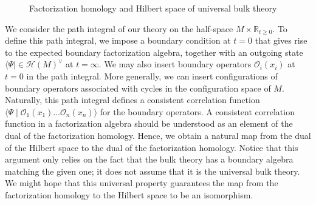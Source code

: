\documentclass[11pt]{article}
\numberwithin{equation}{section}
\begin{document}
\begin{figure}[h!]
\begin{center}
\end{center}\caption{Factorization homology and Hilbert space of universal bulk theory}
	\end{figure}


We consider the path integral of our theory on the half-space $M \times \mathbb{R}_{t \geq 0}$. To define this path integral, we impose a boundary condition at $t = 0$ that gives rise to the expected boundary factorization algebra, together with an outgoing state $\langle \Psi\rvert \in \mathcal{H}(M)^\vee$ at $t = \infty$. We may also insert boundary operators $\mathcal{O}_i(x_i)$ at $t = 0$ in the path integral. More generally, we can insert configurations of boundary operators associated with cycles in the configuration space of $M$. Naturally, this path integral defines a consistent correlation function $\langle \Psi \mid\mathcal{O}_1(x_1)\dots\mathcal{O}_n(x_n)\rangle$ for the boundary operators. A consistent correlation function in a factorization algebra should be understood as an element of the dual of the factorization homology. Hence, we obtain a natural map from the dual of the Hilbert space to the dual of the factorization homology. Notice that this argument only relies on the fact that the bulk theory has a boundary algebra matching the given one; it does not assume that it is the universal bulk theory. We might hope that this universal property guarantees the map from the factorization homology to the Hilbert space to be an isomorphism. 
\end{document}
